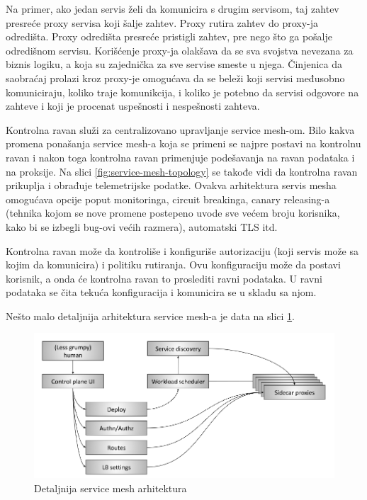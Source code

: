 \documentclass[a4paper,12pt]{report}
\begin{document}
Na primer, ako jedan servis želi da komunicira s drugim servisom, taj zahtev presreće proxy servisa koji šalje zahtev. Proxy rutira zahtev do proxy-ja odredišta. Proxy odredišta presreće pristigli zahtev, pre nego što ga pošalje odredišnom servisu. Korišćenje proxy-ja olakšava da se sva svojstva nevezana za biznis logiku, a koja su zajednička za sve servise smeste u njega. Činjenica da saobraćaj prolazi kroz proxy-je omogućava da se beleži koji servisi međusobno komuniciraju, koliko traje komunikcija, i koliko je potebno da servisi odgovore na zahteve i koji je procenat uspešnosti i nespešnosti zahteva. \newline

Kontrolna ravan služi za centralizovano upravljanje service mesh-om. Bilo kakva promena ponašanja service mesh-a koja se primeni se najpre postavi na kontrolnu ravan i nakon toga kontrolna ravan primenjuje podešavanja na ravan podataka i na proksije. Na slici \ref{fig:service-mesh-topology} se takođe vidi da kontrolna ravan prikuplja i obrađuje telemetrijske podatke. Ovakva arhitektura servis mesha omogućava opcije poput monitoringa, circuit breakinga, canary releasing-a (tehnika kojom se nove promene postepeno uvode sve većem broju korisnika, kako bi se izbegli bug-ovi većih razmera), automatski TLS itd. \newline

Kontrolna ravan može da kontroliše i konfiguriše autorizaciju (koji servis može sa kojim da komunicira) i politiku rutiranja. Ovu konfiguraciju može da postavi korisnik, a onda će kontrolna ravan to proslediti ravni podataka. U ravni podataka se čita tekuća konfiguracija i komunicira se u skladu sa njom. \newline

Nešto malo detaljnija arhitektura service mesh-a je data na slici \ref{fig:advanced-service-mesh-topology}.

\begin{figure}[h]
    \centering
    \includegraphics[width=\textwidth]{advanced-service-mesh-architecture}
    \caption{Detaljnija service mesh arhitektura}
    \label{fig:advanced-service-mesh-topology}
\end{figure}
\end{document}
